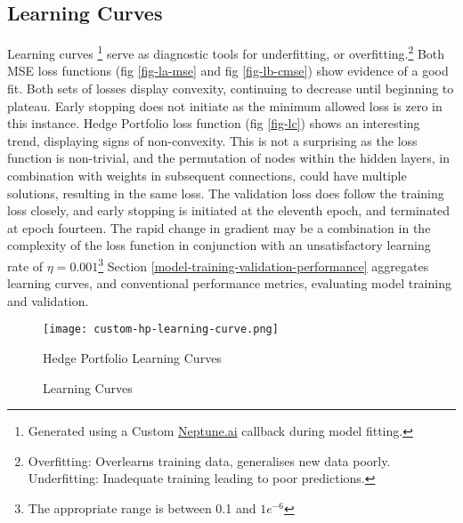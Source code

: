 \documentclass[12pt]{article}
\begin{document}
\subsection{Learning Curves}
Learning curves 
\footnote{Generated using a Custom \href{https://neptune.ai/}{Neptune.ai} callback during model fitting.}
serve as diagnostic tools for underfitting, or overfitting.\footnote{Overfitting: Overlearns training data, generalises new data poorly. Underfitting: Inadequate training leading to poor predictions.}
Both MSE loss functions (fig \ref{fig-la-mse} and fig \ref{fig-lb-cmse}) show evidence of a good fit. 
Both sets of losses display convexity, continuing to decrease until beginning to plateau. 
Early stopping does not initiate as the minimum allowed loss is zero in this instance.
Hedge Portfolio loss function (fig \ref{fig-lc}) shows an interesting trend, displaying signs of non-convexity.
This is not a surprising as the loss function is non-trivial, and the permutation of nodes within the hidden layers,
in combination with weights in subsequent connections, could have multiple solutions, resulting in the same loss.
The validation loss does follow the training loss closely, and early stopping is initiated at the eleventh epoch, and terminated at epoch fourteen.
The rapid change in gradient may be a combination in the complexity of the loss function in conjunction with an unsatisfactory learning rate of $\eta = 0.001$\footnote{The appropriate range is between 0.1 and $1e^{-6}$}
Section \ref{model-training-validation-performance} aggregates learning curves, and conventional performance metrics, evaluating model training and validation.

\begin{figure}[H]
	\centering
    \texttt{[image: custom-hp-learning-curve.png]}
	\caption{Hedge Portfolio Learning Curves}
	\label{fig:hp-lc}
  \end{figure}
\begin{figure}[H]
	\centering
    \vfill
    \caption{Learning Curves}
    \label{fig:mse-learning-curves}
  \end{figure}
 
\end{document}

